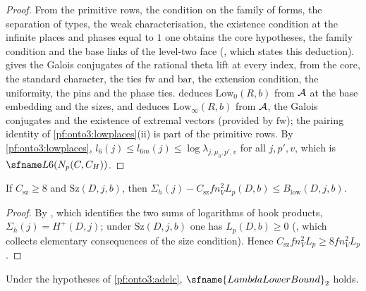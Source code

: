 \begin{proof}
From the primitive rows, the condition on the family of forms, the separation of types, the weak characterisation,
the existence condition at the infinite places and phases equal to $1$ one obtains the core hypotheses, the family
condition and the base links of the level-two face (,
which states this deduction).  gives
the Galois conjugates of the rational theta lift at every index, from the core, the standard character, the ties
$\mathrm{fw}$ and $\mathrm{bar}$, the extension condition, the uniformity, the pins and the phase ties.
 deduces $\mathrm{Low}_0(R,b)$ from
$\mathcal{A}$ at the base embedding and the sizes, and
 deduces $\mathrm{Low}_\infty(R,b)$ from
$\mathcal{A}$, the Galois conjugates and the existence of extremal vectors (provided by $\mathrm{fw}$); the
pairing identity of \cref{pf:onto3:lowplaces}(ii) is part of the primitive rows. By
\cref{pf:onto3:lowplaces}, $l_6(j)\le l_{6m}(j)\le\log\lambda_{j,\mu_0,p',v}$ for all $j,p',v$, which is
$\ontothreeLsix(N_p(C,C_H))$.
\end{proof}

\begin{lemma}\label{pf:onto3:hooksum}
If $C_{\mathrm{sz}}\ge8$ and $\mathrm{Sz}(D,j,b)$, then
$\Sigma_h(j)-C_{\mathrm{sz}}fn_V^2L_p(D,b)\le B_{\mathrm{low}}(D,j,b)$.
\end{lemma}

\begin{proof}
By , which identifies the two sums of logarithms of hook products,
$\Sigma_h(j)=H^+(D,j)$; under $\mathrm{Sz}(D,j,b)$ one has $L_p(D,b)\ge0$
(, which collects elementary consequences of the size
condition). Hence $C_{\mathrm{sz}}fn_V^2L_p\ge8fn_V^2L_p$.
\end{proof}

\begin{theorem}\label{pf:onto3:lamlow}
Under the hypotheses of \cref{pf:onto3:adelc}, $\sfname{LambdaLowerBound}_2$ holds.
\end{theorem}


